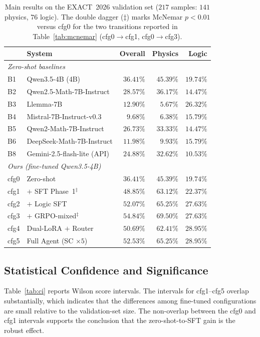\documentclass[preprint,12pt]{elsarticle}
\newcommand{\basemodelname}{Qwen3.5-4B}
\newcommand{\dataset}{EXACT~2026}
\begin{document}
\begin{table}[t]
\centering
\caption{Main results on the \dataset{} validation set ($217$ samples:
         $141$ physics, $76$ logic). The double dagger ($\ddagger$) marks
         McNemar $p<0.01$ versus cfg0 for the two transitions reported in
         Table~\ref{tab:mcnemar} (cfg0$\rightarrow$cfg1,
         cfg0$\rightarrow$cfg3).}
\label{tab:main}
\begin{tabular}{llrrr}
\toprule
& System & Overall & Physics & Logic \\
\midrule
\multicolumn{5}{l}{\textit{Zero-shot baselines}} \\
B1 & \basemodelname{} (4B)            & $36.41\%$ & $45.39\%$ & $19.74\%$ \\
B2 & Qwen2.5-Math-7B-Instruct         & $28.57\%$ & $36.17\%$ & $14.47\%$ \\
B3 & Llemma-7B                        & $12.90\%$ & $\phantom{0}5.67\%$ & $26.32\%$ \\
B4 & Mistral-7B-Instruct-v0.3         & $\phantom{0}9.68\%$ & $\phantom{0}6.38\%$ & $15.79\%$ \\
B5 & Qwen2-Math-7B-Instruct           & $26.73\%$ & $33.33\%$ & $14.47\%$ \\
B6 & DeepSeek-Math-7B-Instruct        & $11.98\%$ & $\phantom{0}9.93\%$ & $15.79\%$ \\
B8 & Gemini-2.5-flash-lite (API)      & $24.88\%$ & $32.62\%$ & $10.53\%$ \\
\midrule
\multicolumn{5}{l}{\textit{Ours (fine-tuned \basemodelname{})}} \\
cfg0 & Zero-shot                      & $36.41\%$ & $45.39\%$ & $19.74\%$ \\
cfg1 & $+$ SFT Phase~1$^{\ddagger}$   & $48.85\%$ & $63.12\%$ & $22.37\%$ \\
cfg2 & $+$ Logic SFT                  & $52.07\%$ & $65.25\%$ & $27.63\%$ \\
cfg3 & $+$ GRPO-mixed$^{\ddagger}$    & $\mathbf{54.84\%}$ & $\mathbf{69.50\%}$ & $27.63\%$ \\
cfg4 & Dual-LoRA $+$ Router           & $50.69\%$ & $62.41\%$ & $28.95\%$ \\
cfg5 & Full Agent (SC $\times 5$)     & $52.53\%$ & $65.25\%$ & $28.95\%$ \\
\bottomrule
\end{tabular}
\end{table}

\subsection{Statistical Confidence and Significance}
Table~\ref{tab:ci} reports Wilson score intervals. The intervals for
cfg1--cfg5 overlap substantially, which indicates that the differences among
fine-tuned configurations are small relative to the validation-set size. The
non-overlap between the cfg0 and cfg1 intervals supports the conclusion that
the zero-shot-to-SFT gain is the robust effect.
\end{document}

